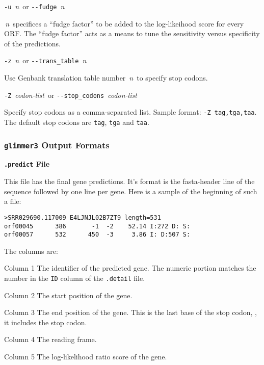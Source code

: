 \documentclass[fleqn,titlepage,11pt]{article}
\def\Desc#1{\,\mbox{\emph{#1}}\,}
\def\Pg#1{\texttt{#1}}
\begin{document}
\exdent
  \verb`-u` \Desc{n} \enskip or \enskip \verb`--fudge` \Desc{n}

  \Desc{n} specifices a ``fudge factor'' to be added to the
  log-likeihood score for every ORF. The ``fudge factor'' acts as a
  means to tune the sensitivity versus specificity of the predictions.
  
\exdent
  \verb`-z` \Desc{n} \enskip or \enskip \verb`--trans_table` \Desc{n}

  Use Genbank translation table number \Desc{n} to specify stop codons.

\exdent
  \verb`-Z` \Desc{codon-list} \enskip or \enskip \verb`--stop_codons` \Desc{codon-list}

  Specify stop codons as a comma-separated list.
  Sample format:  \verb`-Z tag,tga,taa`.
  The default stop codons are \Pg{tag}, \Pg{tga} and \Pg{taa}.
\el


\subsubsection{\Pg{glimmer3} Output Formats}

\smallskip
\noindent\textbf{\Pg{.predict} File}
\smallskip

This file has the final gene predictions.  It's format is the fasta-header
line of the sequence followed by one line per gene.  Here is a sample of the
beginning of such a file:
\BSV
\begin{verbatim}
>SRR029690.117009 E4LJNJL02B7ZT9 length=531
orf00045      386       -1  -2    52.14 I:272 D: S:
orf00057      532      450  -3     3.86 I: D:507 S:
\end{verbatim}
\ESV
The columns are:
\RaggedRight
\item[Column 1]
  The identifier of the predicted gene.  The numeric portion matches the
  number in the \Pg{ID} column of the \Pg{.detail} file.

\item[Column 2]
  The start position of the gene.

\item[Column 3]
  The end position of the gene.  This is the last base of the stop codon, \ie,
  it includes the stop codon.

\item[Column 4]
  The reading frame.

\item[Column 5]
  The log-likelihood ratio score of the gene.
\el
\end{document}
